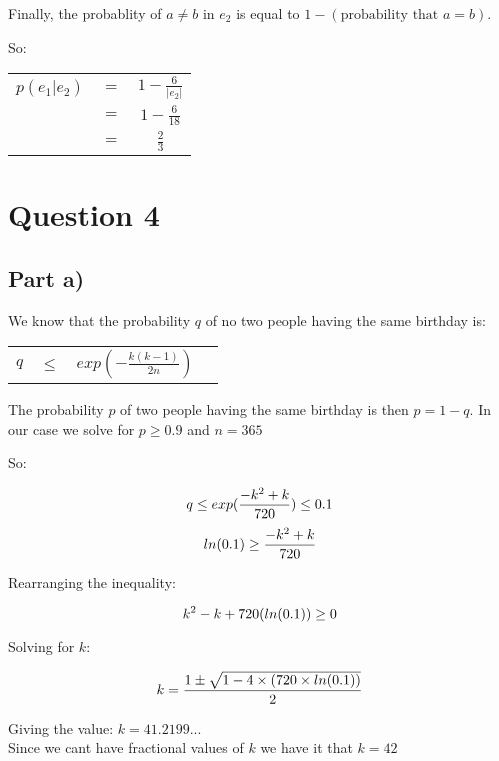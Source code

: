 \documentclass{article}
\numberwithin{equation}{subsection}
\begin{document}
	Finally, the probablity of $a\not=b$ in $e_2$ is equal to $1-(\textrm{probability that }a=b)$.

	So:

	\begin{tabular}{c c c}	
		$p(e_1 | e_2)$ &$=$& $1-\frac{6}{|e_2|}$ \\
									&$=$& $1-\frac{6}{18}$		\\
									&$=$&	$\frac{2}{3}$
	\end{tabular}


	\newpage
	\thispagestyle{fancy}

	\section*{Question 4}
	\subsection*{Part a)}
	We know that the probability $q$ of no two people having the same birthday is:
	
	\begin{tabular}{c c c c}
		$q$	&	$\le$	& $exp(- \frac{k(k-1)}{2n})$
	\end{tabular}

	The probability $p$ of two people having the same birthday is then $p=1-q$. In our case we solve for $p\ge0.9$ and $n=365$

	\vspace{10pt}
	So:

	\begin{equation}\notag
		q	\le	exp(\frac{-k^2+k}{720}) \le 0.1
	\end{equation}
	\begin{equation}\notag
		ln(0.1)\ge \frac{-k^2+k}{720}
	\end{equation}

	\vspace{10pt}
	Rearranging the inequality:

	\begin{equation}\notag
		k^2 - k + 720(ln(0.1)) \ge 0	
	\end{equation}

	Solving for $k$:

	\begin{equation}\notag
		k = \frac{1 \pm \sqrt{1-4\times(720\times ln(0.1))}}{2}	
	\end{equation}

	Giving the value: $k=41.2199...$\\
	Since we cant have fractional values of $k$ we have it that $k=42$
\end{document}
